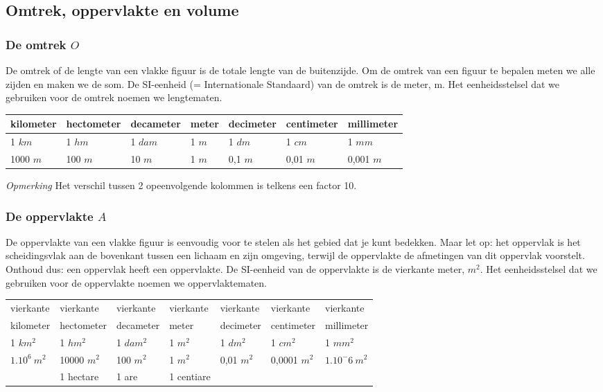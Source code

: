 \subsection{Omtrek, oppervlakte en volume}

\subsubsection{De omtrek $O$}
De omtrek of de lengte van een vlakke figuur is de totale lengte van de buitenzijde. Om de omtrek van een figuur te bepalen meten we alle zijden en maken we de som. De SI-eenheid (= Internationale Standaard) van de omtrek is de meter, m. Het eenheidsstelsel dat we gebruiken voor de omtrek noemen we lengtematen.

\begin{center}
\begin{tabular}{lllllll}
kilometer & hectometer & decameter & meter & decimeter & centimeter & millimeter \\
\hline
1 $km$ & 1 $hm$ & 1 $dam$ & 1 $m$ & 1 $dm$ & 1 $cm$ & 1 $mm$ \\
1000 $m$ & 100 $m$ & 10 $m$ & 1 $m$ & 0,1 $m$ & 0,01 $m$ & 0,001 $m$ 
\end{tabular}
\end{center}

\emph{Opmerking}
Het verschil tussen 2 opeenvolgende kolommen is telkens een factor 10.

\subsubsection{De oppervlakte $A$}
De oppervlakte van een vlakke figuur is eenvoudig voor te stelen als het gebied dat je kunt bedekken. 
Maar let op: het oppervlak is het scheidingsvlak aan de bovenkant tussen een lichaam en zijn omgeving, terwijl de oppervlakte de afmetingen van dit oppervlak voorstelt. 
Onthoud dus: een oppervlak heeft een oppervlakte. De SI-eenheid van de oppervlakte is de vierkante meter, $m^2$. Het eenheidsstelsel dat we gebruiken voor de oppervlakte noemen we oppervlaktematen.

\begin{center}
	\begin{tabular}{lllllll}
		vierkante & vierkante & vierkante & vierkante & vierkante & vierkante & vierkante \\
		kilometer & hectometer & decameter & meter & decimeter & centimeter & millimeter \\
		\hline
		1 $km^2$ & 1 $hm^2$ & 1 $dam^2$ & 1 $m^2$ & 1 $dm^2$ & 1 $cm^2$ & 1 $mm^2$ \\
		$1.10^6~ m^2$ & 10000 $m^2$ & 100 $m^2$ & 1 $m^2$ & 0,01 $m^2$ & 0,0001 $m^2$ & $1.10^-6 ~m^2$ \\
		& 1 hectare & 1 are & 1 centiare & & & 
	\end{tabular}
\end{center}

